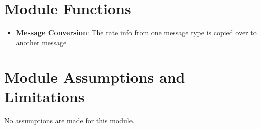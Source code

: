 

\section{Module Functions}

\begin{itemize}
	\item \textbf{Message Conversion}: The rate info from one message type is copied over to another message
\end{itemize}

\section{Module Assumptions and Limitations}
No assumptions are made for this module.